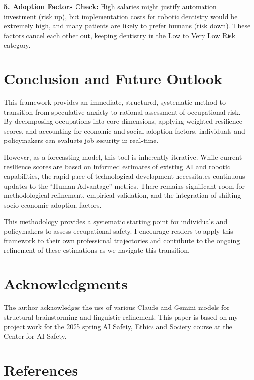 \documentclass[
  11pt,
]{article}
\begin{document}
\textbf{5. Adoption Factors Check:} High salaries might justify
automation investment (risk up), but implementation costs for robotic
dentistry would be extremely high, and many patients are likely to
prefer humans (risk down). These factors cancel each other out, keeping
dentistry in the Low to Very Low Risk category.

\section{Conclusion and Future
Outlook}\label{conclusion-and-future-outlook}

This framework provides an immediate, structured, systematic method to
transition from speculative anxiety to rational assessment of
occupational risk. By decomposing occupations into core dimensions,
applying weighted resilience scores, and accounting for economic and
social adoption factors, individuals and policymakers can evaluate job
security in real-time.

However, as a forecasting model, this tool is inherently iterative.
While current resilience scores are based on informed estimates of
existing AI and robotic capabilities, the rapid pace of technological
development necessitates continuous updates to the ``Human Advantage''
metrics. There remains significant room for methodological refinement,
empirical validation, and the integration of shifting socio-economic
adoption factors.

This methodology provides a systematic starting point for individuals
and policymakers to assess occupational safety. I encourage readers to
apply this framework to their own professional trajectories and
contribute to the ongoing refinement of these estimations as we navigate
this transition.

\section{Acknowledgments}\label{acknowledgments}

The author acknowledges the use of various Claude and Gemini models for
structural brainstorming and linguistic refinement. This paper is based
on my project work for the 2025 spring AI Safety, Ethics and Society
course at the Center for AI Safety.

\section{References}\label{references}
\end{document}
